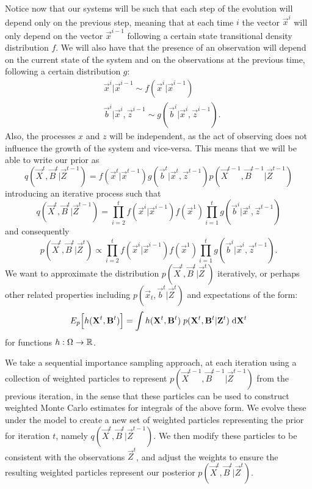 Notice now that our systems will be such that each step of the evolution will depend only on the previous step, meaning that at each time $i$ the vector $\vec{x}^i$ will only depend on the vector $\vec{x}^{i-1}$ following a certain state transitional density distribution $f$. We will also have that the presence of an observation will depend on the current state of the system and on the observations at the previous time, following a certain distribution $g$:
\begin{align*}
    &\vec{x}^i | \vec{x}^{i-1} \sim f(\vec{x}^i | \vec{x}^{i-1})\\
    &\vec{b}^i | \vec{x}^i, \vec{z}^{i-1} \sim g(\vec{b}^i | \vec{x}^i, \vec{z}^{i-1}).
\end{align*}
Also, the processes $x$ and $z$ will be independent, as the act of observing does not influence the growth of the system and vice-versa.
This means that we will be able to write our prior as 
\begin{equation*}
    q(\vec{X}^t, \vec{B}^t | \vec{Z}^{t-1}) = f(\vec{x}^t | \vec{x}^{t-1}) g(\vec{b}^t | \vec{x}^t, \vec{z}^{t-1}) p(\vec{X}^{t-1}, \vec{B}^{t-1} | \vec{Z}^{t-1})
\end{equation*}
introducing an iterative process such that
\begin{equation*}
    q(\vec{X}^t, \vec{B}^t | \vec{Z}^{t-1}) = \prod_{i=2}^t f(\vec{x}^i | \vec{x}^{i-1}) f(\vec{x}^1) \prod_{i=1}^t g(\vec{b}^i | \vec{x}^i, \vec{z}^{t-1})
\end{equation*}
and consequently
\begin{equation*}
    p(\vec{X}^t, \vec{B}^t | \vec{Z}^t) \propto \prod_{i=2}^t f(\vec{x}^i | \vec{x}^{i-1}) f(\vec{x}^1) \prod_{i=1}^t g(\vec{b}^i | \vec{x}^i, \vec{z}^{t-1}).
\end{equation*}
We want to approximate the distribution $p(\vec{X}^{t}, \vec{B}^{t} | \vec{Z}^{t})$ iteratively, or perhaps other related properties including   $p(\vec{x}_{t}, \vec{b}^{t} | \vec{Z}^{t})$ and expectations of the form:
\begin{equation*}
    E_{p} \Big[h(\mathbf{X}^{t}, \mathbf{B}^{t} ) \Big] = \int h(\mathbf{X}^{t}, \mathbf{B}^{t})\; p(\mathbf{X}^{t}, \mathbf{B}^{t} | \mathbf{Z}^{t})\; \mathrm{d} \mathbf{X}^{t}
\end{equation*}
for functions $h: \Omega  \rightarrow \mathbb R$. 

We take a sequential importance sampling approach, at each iteration using a collection of weighted particles to represent $p(\vec{X}^{t-1}, \vec{B}^{t-1} | \vec{Z}^{t-1})$ from the previous iteration, in the sense that these particles can be used to construct weighted Monte Carlo estimates for integrals of the above form. We evolve these under the model to create a new set of weighted particles representing the prior for iteration $t$, namely $q(\vec{X}^{t}, \vec{B}^{t} | \vec{Z}^{t-1})$. We then modify these particles to be consistent with the observations $\vec{Z}^{t}$, and adjust the weights to ensure the resulting weighted particles represent our posterior $p(\vec{X}^{t}, \vec{B}^{t} | \vec{Z}^{t})$.

